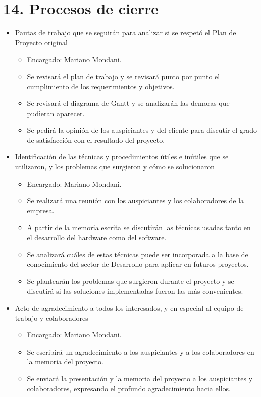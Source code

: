 \documentclass[
11pt, %
codirector, %
]{charter}
\begin{document}


\section{14. Procesos de cierre}    
\label{sec:cierre}


\begin{itemize}
	\item Pautas de trabajo que se seguirán para analizar si se respetó el Plan de Proyecto original
	\begin{itemize}
		\item Encargado: Mariano Mondani.
		\item Se revisará el plan de trabajo y se revisará punto por punto el cumplimiento de los
requerimientos y objetivos.
		\item Se revisará el diagrama de Gantt y se analizarán las demoras que pudieran aparecer.
		\item Se pedirá la opinión de los auspiciantes y del cliente para discutir el grado de
satisfacción con el resultado del proyecto.
	\end{itemize}
	
	\item Identificación de las técnicas y procedimientos útiles e inútiles que se utilizaron, y los problemas que surgieron y cómo se solucionaron
	\begin{itemize}
		\item Encargado: Mariano Mondani.
		\item Se realizará una reunión con los auspiciantes y los colaboradores de la empresa.
		\item A partir de la memoria escrita se discutirán las técnicas usadas tanto en el desarrollo del hardware como del software.
		\item Se analizará cuáles de estas técnicas puede ser incorporada a la base de conocimiento del sector de Desarrollo para aplicar en futuros proyectos.
		\item Se plantearán los problemas que surgieron durante el proyecto y se discutirá si las
soluciones implementadas fueron las más convenientes.
	\end{itemize}
	
	\item Acto de agradecimiento a todos los interesados, y en especial al equipo de trabajo y
colaboradores
	\begin{itemize}
		\item Encargado: Mariano Mondani.
		\item Se escribirá un agradecimiento a los auspiciantes y a los colaboradores en la memoria del proyecto.
		\item  Se enviará la presentación y la memoria del proyecto a los auspiciantes y
colaboradores, expresando el profundo agradecimiento hacia ellos.
	\end{itemize}
\end{itemize}

\end{document}
